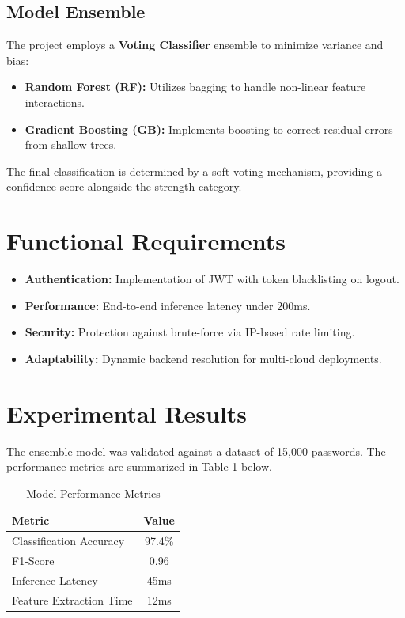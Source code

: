 \documentclass[12pt,a4paper]{article}
\begin{document}
\subsection{Model Ensemble}
The project employs a \textbf{Voting Classifier} ensemble to minimize variance and bias:
\begin{itemize}
    \item \textbf{Random Forest (RF):} Utilizes bagging to handle non-linear feature interactions.
    \item \textbf{Gradient Boosting (GB):} Implements boosting to correct residual errors from shallow trees.
\end{itemize}
The final classification is determined by a soft-voting mechanism, providing a confidence score alongside the strength category.

\section{Functional Requirements}
\begin{itemize}
    \item \textbf{Authentication:} Implementation of JWT with token blacklisting on logout.
    \item \textbf{Performance:} End-to-end inference latency under 200ms.
    \item \textbf{Security:} Protection against brute-force via IP-based rate limiting.
    \item \textbf{Adaptability:} Dynamic backend resolution for multi-cloud deployments.
\end{itemize}

\section{Experimental Results}
The ensemble model was validated against a dataset of 15,000 passwords. The performance metrics are summarized in Table 1 below.

\begin{table}[h]
\centering
\caption{Model Performance Metrics}
\vspace{2mm}
\begin{tabular}{@{}lc@{}}
\toprule
\textbf{Metric} & \textbf{Value} \\ \midrule
Classification Accuracy & 97.4\% \\
F1-Score & 0.96 \\
Inference Latency & 45ms \\
Feature Extraction Time & 12ms \\ \bottomrule
\end{tabular}
\end{table}
\end{document}
